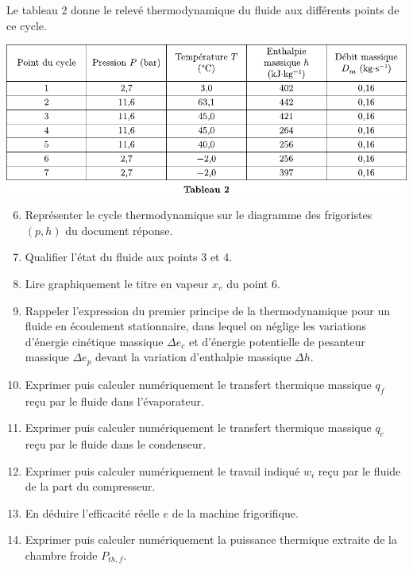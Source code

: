\documentclass[a4paper, 12pt, garamond]{book}
\begin{document}
Le tableau 2 donne le relevé thermodynamique du fluide aux différents
points de ce cycle.

\begin{center}

	\includegraphics[scale=1]{figures/pb-chambre-tab2.pdf}

\end{center}

\begin{enumerate}
	\setcounter{enumi}{5}
	\item
	      Représenter le cycle thermodynamique sur le diagramme des frigoristes
	      \((p,h)\) du document réponse.
	\item
	      Qualifier l'état du fluide aux points 3 et 4.
	\item
	      Lire graphiquement le titre en vapeur \(x_v\) du point 6.
	\item
	      Rappeler l'expression du premier principe de la thermodynamique pour
	      un fluide en écoulement stationnaire, dans lequel on néglige les
	      variations d'énergie cinétique massique \(\Delta e_c\) et d'énergie
	      potentielle de pesanteur massique \(\Delta e_p\) devant la variation
	      d'enthalpie massique \(\Delta h\).
	\item
	      Exprimer puis calculer numériquement le transfert thermique massique
	      \(q_f\) reçu par le fluide dans l'évaporateur.
	\item
	      Exprimer puis calculer numériquement le transfert thermique massique
	      \(q_c\) reçu par le fluide dans le condenseur.
	\item
	      Exprimer puis calculer numériquement le travail indiqué \(w_i\) reçu
	      par le fluide de la part du compresseur.
	\item
	      En déduire l'efficacité réelle \(e\) de la machine frigorifique.
	\item
	      Exprimer puis calculer numériquement la puissance thermique extraite
	      de la chambre froide \(P_{th,f}\).
\end{enumerate}
\end{document}
